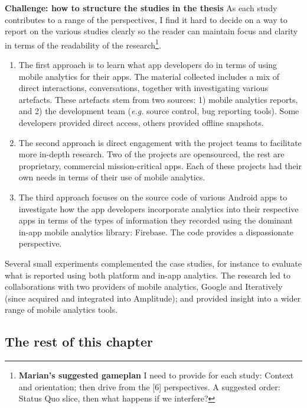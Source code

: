 \textbf{Challenge: how to structure the studies in the thesis} As each study contributes to a range of the perspectives, I find it hard to decide on a way to report on the various studies clearly so the reader can maintain focus and clarity in terms of the readability of the research\footnote{
\textbf{Marian's suggested gameplan} 
I need to provide for each study:
Context and orientation; then drive from the [6] perspectives.
A suggested order: Status Quo slice, then what happens if we interfere?
}.

\begin{enumerate}
    \item The first approach is to learn what app developers do in terms of using mobile analytics for their apps. The material collected includes a mix of direct interactions, conversations, together with investigating various artefacts. These artefacts stem from two sources: 1) mobile analytics reports, and 2) the development team (\emph{e.g.} source control, bug reporting tools). Some developers provided direct access, others provided offline snapshots.
    \item The second approach is direct engagement with the project teams to facilitate more in-depth research. Two of the projects are opensourced, the rest are proprietary, commercial mission-critical apps. Each of these projects had their own needs in terms of their use of mobile analytics.  %
    \item The third approach focuses on the source code of various Android apps to investigate how the app developers incorporate analytics into their respective apps in terms of the types of information they recorded using the dominant in-app mobile analytics library: Firebase. The code provides a dispassionate perspective. %
\end{enumerate}

Several small experiments complemented the case studies, for instance to evaluate what is reported using both platform and in-app analytics. 
The research led to collaborations with two providers of mobile analytics, Google and Iteratively (since acquired and integrated into Amplitude); and provided insight into a wider range of mobile analytics tools.


\subsection{The rest of this chapter}

